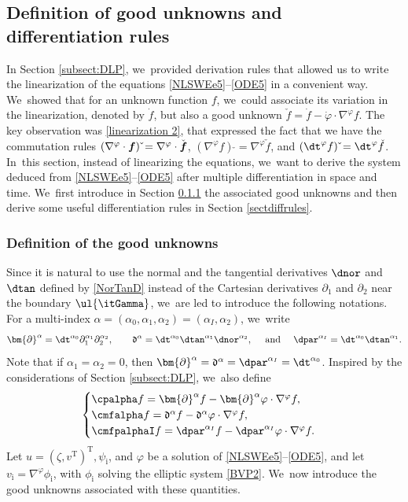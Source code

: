 \subsection{Definition of good unknowns and differentiation rules}\label{subsect:defGU}
In Section \ref{subsect:DLP}, we~provided derivation rules that allowed us to write the linearization of the equations \eqref{NLSWEe5}--\eqref{ODE5} in a convenient way. We~showed that for an unknown function $f$, we~could associate its variation in the linearization, denoted by $\dot{f}$, but also a good unknown $\check{f}=\dot{f}-\dot{\varphi}\cdot\nabla^\varphi f$.
The key observation was \eqref{linearization 2}, that expressed the fact that we have the commutation rules
$(\nabla^\varphi\cdot \mbox{\boldmath$f$})\,\check{} = \nabla^\varphi\cdot \check{\mbox{\boldmath$f$}}$, $(\nabla^\varphi f)\,\check{}
= \nabla^\varphi \check{f}$, and $(\dt^\varphi f)\,\check{} = \dt^\varphi \check{f}$. In~this section, instead of linearizing the equations, we~want to derive the system deduced from \eqref{NLSWEe5}--\eqref{ODE5} after multiple differentiation in space and time. We~first introduce in Section \ref{sectdefGU} the associated good unknowns and then derive some useful differentiation rules in Section \ref{sectdiffrules}.

\subsubsection{Definition of the good unknowns}\label{sectdefGU}
Since it is natural to use the normal and the tangential derivatives $\dnor$ and $\dtan$ defined by \eqref{NorTanD}
instead of the Cartesian derivatives $\partial_1$ and $\partial_2$ near the boundary $\ul{\itGamma}$, we~are led to introduce the following notations.
For a multi-index $\alpha=(\alpha_0,\alpha_1,\alpha_2)=(\alpha_I,\alpha_2)$, we~write
\[
\bm{\partial}^\alpha=\dt^{\alpha_0}\partial_1^{\alpha_1}\partial_2^{\alpha_2}, \qquad
\mathfrak{d}^\alpha=\dt^{\alpha_0}\dtan^{\alpha_1}\dnor^{\alpha_2},
\quad\mbox{ and } \quad
\dpar^{\alpha_I}=\dt^{\alpha_0}\dtan^{\alpha_1}.
\]
Note that if $\alpha_1=\alpha_2=0$, then $\bm{\partial}^\alpha=\mathfrak{d}^\alpha=\dpar^{\alpha_I}=\dt^{\alpha_0}$.
Inspired by the considerations of Section \ref{subsect:DLP}, we~also define
\[
\begin{cases}
\cpalpha f = \bm{\partial}^\alpha f -\bm{\partial}^\alpha\varphi\cdot \nabla^\varphi f, \\
\cmfalpha f=\mathfrak{d}^\alpha f -\mathfrak{d}^\alpha\varphi\cdot \nabla^\varphi f, \\
\cmfpalphaI f=\dpar^{\alpha_I} f -\dpar^{\alpha_I}\varphi\cdot \nabla^\varphi f.
\end{cases}
\]
Let $u=(\zeta,v^\mathrm{T})^\mathrm{T},\psi_\mathrm{i}$, and $\varphi$ be a solution of \eqref{NLSWEe5}--\eqref{ODE5},
and let $v_\mathrm{i}=\nabla^\varphi\phi_\mathrm{i}$, with $\phi_\mathrm{i}$ solving the elliptic system \eqref{BVP2}. We~now introduce the good unknowns associated with these quantities.

